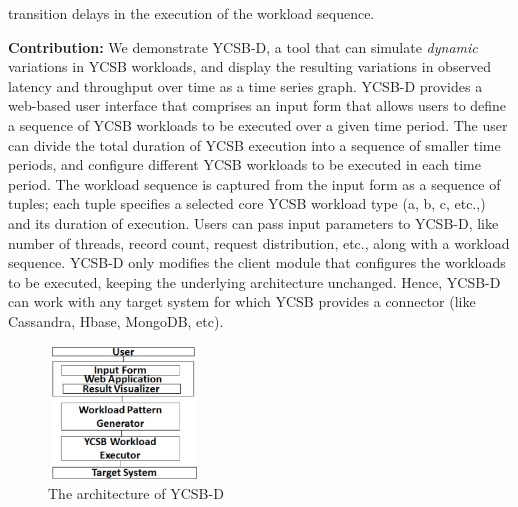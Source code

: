 \documentclass{vldb}
\begin{document}
                 transition delays in the execution of the workload sequence.
            \par \textbf{Contribution:} We demonstrate  YCSB-D, a tool that can simulate \emph{dynamic} variations in YCSB workloads, and display the resulting variations in observed latency and throughput over time as a time series graph. YCSB-D provides a web-based user interface that comprises an input form that allows users to define a sequence of  YCSB workloads to be executed over a given time period. The user can divide the total duration of YCSB execution into a sequence of smaller time periods, and configure different YCSB workloads to be executed in each time period. The workload sequence is captured from the input form as a sequence of tuples; each tuple specifies a selected core YCSB workload type (a, b, c, etc.,) and its duration of execution. Users can  pass input parameters to YCSB-D, like number of threads, record count, request distribution, etc., along with a workload sequence.
             YCSB-D only modifies the client module that configures the workloads to be executed, keeping the underlying
             architecture unchanged. Hence, YCSB-D  can work with any target system for which YCSB provides a connector 
             (like Cassandra, Hbase, MongoDB, etc).
            \begin{figure}[!htbp]
        \centering
        \includegraphics[width=1.6in,height=1.4in]
                    {arch.eps}
        \caption{The architecture of YCSB-D}
        \label{fig:Arch}
\end{figure}
\end{document}
